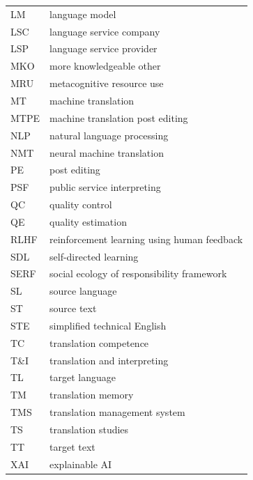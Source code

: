 \begin{tabularx}{.48\textwidth}{lQ}
LM     &language model                                                  \\
LSC    &language service company                                        \\
LSP    &language service provider                                       \\
MKO    &more knowledgeable other                                        \\
MRU    & metacognitive resource use                                     \\
MT     &machine translation                                             \\
MTPE   &machine translation post editing                                \\
NLP    &natural language processing                                     \\
NMT    &neural machine translation                                      \\
PE     &post editing                                                    \\
PSF    &public service interpreting                                     \\
QC     &quality control                                                 \\
QE     &quality estimation                                              \\
RLHF   &reinforcement learning using human feedback                     \\
SDL    &self-directed learning                                          \\
SERF   &social ecology of responsibility framework                      \\
SL     &source language                                                 \\
ST     &source text                                                     \\
STE    &simplified technical English                                    \\
TC     &translation competence                                          \\
T\&I   & translation and interpreting                                   \\
TL     &target language                                                 \\
TM     &translation memory                                              \\
TMS    &translation management system                                   \\
TS     &translation studies                                             \\
TT     &target text                                                     \\
XAI    &explainable AI                                                  \\
\end{tabularx}
